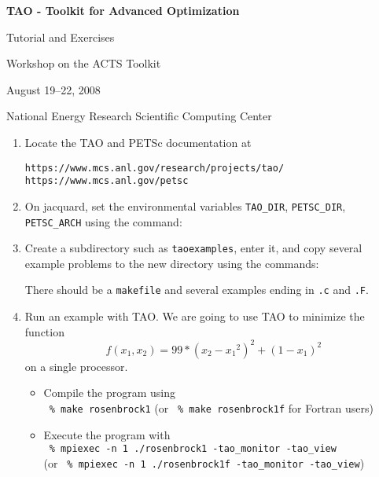 \documentclass[11pt]{article}
\begin{document}
\begin{center}
{\bf
TAO - Toolkit for Advanced Optimization
        
Tutorial and Exercises

\vspace{0.25in}

Workshop on the ACTS Toolkit

August 19--22, 2008

National Energy Research Scientific Computing Center
}
\end{center}
\vspace{0.25in}

\begin{enumerate}

\item Locate the TAO and PETSc documentation at 
\begin{alltt}
https://www.mcs.anl.gov/research/projects/tao/
https://www.mcs.anl.gov/petsc
\end{alltt}

\item On jacquard, set the environmental variables
\texttt{TAO\_DIR}, \texttt{PETSC\_DIR}, \texttt{PETSC\_ARCH} 
using the command:
\begin{alltt}
% module load tao/1.9_g_c++
\end{alltt}

\item Create a subdirectory such as \texttt{taoexamples}, enter it, and copy several example problems to the new directory using the commands:
\begin{alltt}
% mkdir taoexamples
% cd taoexamples
% cp -R \$TAO_DIR/src/unconstrained/tutorials/* .
% ls
\end{alltt}
There should be a \texttt{makefile} and several examples ending in \texttt{.c} and \texttt{.F}.

\item Run an example with TAO.
We are going to use TAO to minimize the function 
\[
    f(x_1,x_2) = 99*(x_2-{x_1}^2)^2 + (1-x_1)^2 
\]
on a single processor.
\begin{itemize}

 \item Compile the program using \\
  \quad \texttt{ \% make rosenbrock1} 
  (or \texttt{ \% make rosenbrock1f} for Fortran users)

 \item Execute the program with \\
  \quad \texttt{ \% mpiexec -n 1 ./rosenbrock1 -tao\_monitor -tao\_view} \\
  (or \texttt{ \% mpiexec -n 1 ./rosenbrock1f -tao\_monitor -tao\_view}) \\


\end{itemize}
\end{enumerate}
\end{document}
